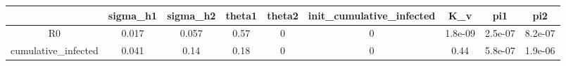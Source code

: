 \begin{tabular}{|c|c|c|c|c|c|c|c|c|}
\hline
& sigma_h1 & sigma_h2 & theta1 & theta2 & init_cumulative_infected & K_v & pi1 & pi2 \\
\hline
R0 & 0.017 & 0.057 & 0.57 & 0 & 0 & 1.8e-09 & 2.5e-07 & 8.2e-07 \\
\hline
cumulative_infected & 0.041 & 0.14 & 0.18 & 0 & 0 & 0.44 & 5.8e-07 & 1.9e-06 \\
\hline
\end{tabular}
